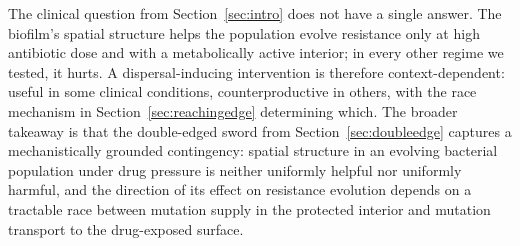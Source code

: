The clinical question from Section~\ref{sec:intro} does not have a single answer. The biofilm's spatial structure helps the population evolve resistance only at high antibiotic dose and with a metabolically active interior; in every other regime we tested, it hurts. A dispersal-inducing intervention is therefore context-dependent: useful in some clinical conditions, counterproductive in others, with the race mechanism in Section~\ref{sec:reachingedge} determining which. The broader takeaway is that the double-edged sword from Section~\ref{sec:doubleedge} captures a mechanistically grounded contingency: spatial structure in an evolving bacterial population under drug pressure is neither uniformly helpful nor uniformly harmful, and the direction of its effect on resistance evolution depends on a tractable race between mutation supply in the protected interior and mutation transport to the drug-exposed surface.
